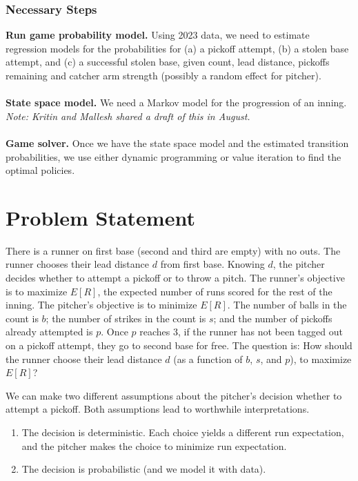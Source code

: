 \documentclass{article}
\begin{document}
\subsubsection*{Necessary Steps}

{\bf Run game probability model.} Using 2023 data, we need to estimate regression models for the probabilities for (a) a pickoff attempt, (b) a stolen base attempt, and (c) a successful stolen base, given count, lead distance, pickoffs remaining and catcher arm strength (possibly a random effect for pitcher).\\
~\\
{\bf State space model.} We need a Markov model for the progression of an inning. {\it Note: Kritin and Mallesh shared a draft of this in August.}\\
~\\
{\bf Game solver.} Once we have the state space model and the estimated transition probabilities, we use either dynamic programming or value iteration to find the optimal policies.\\


  \section{Problem Statement}

  There is a runner on first base (second and third are empty) with no outs. The runner chooses their lead distance $d$ from first base. Knowing $d$, the pitcher decides whether to attempt a pickoff or to throw a pitch. The runner's objective is to maximize $E[R]$, the expected number of runs scored for the rest of the inning. The pitcher's objective is to minimize $E[R]$. The number of balls in the count is $b$; the number of strikes in the count is $s$; and the number of pickoffs already attempted is $p$. Once $p$ reaches 3, if the runner has not been tagged out on a pickoff attempt, they go to second base for free. The question is: How should the runner choose their lead distance $d$ (as a function of $b$, $s$, and $p$), to maximize $E[R]$?

  We can make two different assumptions about the pitcher's decision whether to attempt a pickoff. Both assumptions lead to worthwhile interpretations.
  \begin{enumerate}
      \item The decision is deterministic. Each choice yields a different run expectation, and the pitcher makes the choice to minimize run expectation.
      \item The decision is probabilistic (and we model it with data).
  \end{enumerate}
\end{document}

